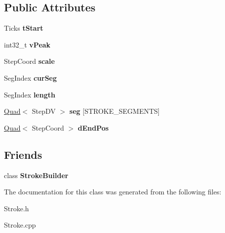 \subsection*{Public Attributes}
\begin{DoxyCompactItemize}
\item 
\hypertarget{classfirestep_1_1_stroke_a6717b5312700a32011c50912c29c058d}{Ticks {\bfseries t\+Start}}\label{classfirestep_1_1_stroke_a6717b5312700a32011c50912c29c058d}

\item 
\hypertarget{classfirestep_1_1_stroke_af273db9ee21139613c9af959202023bb}{int32\+\_\+t {\bfseries v\+Peak}}\label{classfirestep_1_1_stroke_af273db9ee21139613c9af959202023bb}

\item 
\hypertarget{classfirestep_1_1_stroke_a289c5c1e012d347f77b6359786e646ad}{Step\+Coord {\bfseries scale}}\label{classfirestep_1_1_stroke_a289c5c1e012d347f77b6359786e646ad}

\item 
\hypertarget{classfirestep_1_1_stroke_a1d00ba6a62370fdda82fcc4e5e941c08}{Seg\+Index {\bfseries cur\+Seg}}\label{classfirestep_1_1_stroke_a1d00ba6a62370fdda82fcc4e5e941c08}

\item 
\hypertarget{classfirestep_1_1_stroke_af7b85d7a9d6be39ea78f299b7a15da3a}{Seg\+Index {\bfseries length}}\label{classfirestep_1_1_stroke_af7b85d7a9d6be39ea78f299b7a15da3a}

\item 
\hypertarget{classfirestep_1_1_stroke_a0df9212c33956be8be25c4810d817720}{\hyperlink{classfirestep_1_1_quad}{Quad}$<$ Step\+D\+V $>$ {\bfseries seg} \mbox{[}S\+T\+R\+O\+K\+E\+\_\+\+S\+E\+G\+M\+E\+N\+T\+S\mbox{]}}\label{classfirestep_1_1_stroke_a0df9212c33956be8be25c4810d817720}

\item 
\hypertarget{classfirestep_1_1_stroke_aa189def3d15a829cf2de500dfc753de5}{\hyperlink{classfirestep_1_1_quad}{Quad}$<$ Step\+Coord $>$ {\bfseries d\+End\+Pos}}\label{classfirestep_1_1_stroke_aa189def3d15a829cf2de500dfc753de5}

\end{DoxyCompactItemize}
\subsection*{Friends}
\begin{DoxyCompactItemize}
\item 
\hypertarget{classfirestep_1_1_stroke_a13ac7d286c50427a8e60089ab16eb054}{class {\bfseries Stroke\+Builder}}\label{classfirestep_1_1_stroke_a13ac7d286c50427a8e60089ab16eb054}

\end{DoxyCompactItemize}


The documentation for this class was generated from the following files\+:\begin{DoxyCompactItemize}
\item 
Stroke.\+h\item 
Stroke.\+cpp\end{DoxyCompactItemize}
